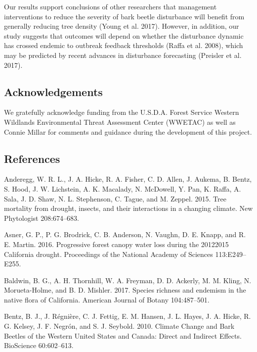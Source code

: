 \documentclass[]{article}
\begin{document}
Our results support conclusions of other researchers that management
interventions to reduce the severity of bark beetle disturbance will
benefit from generally reducing tree density (Young et al. 2017).
However, in addition, our study suggests that outcomes will depend on
whether the disturbance dynamic has crossed endemic to outbreak feedback
thresholds (Raffa et al. 2008), which may be predicted by recent
advances in disturbance forecasting (Preisler et al. 2017).

\subsection{Acknowledgements}\label{acknowledgements}

We gratefully acknowledge funding from the U.S.D.A. Forest Service
Western Wildlands Environmental Threat Assessment Center (WWETAC) as
well as Connie Millar for comments and guidance during the development
of this project.

\subsection*{References}\label{references}

\hypertarget{refs}{}
\hypertarget{ref-anderegg2015a}{}
Anderegg, W. R. L., J. A. Hicke, R. A. Fisher, C. D. Allen, J. Aukema,
B. Bentz, S. Hood, J. W. Lichstein, A. K. Macalady, N. McDowell, Y. Pan,
K. Raffa, A. Sala, J. D. Shaw, N. L. Stephenson, C. Tague, and M.
Zeppel. 2015. Tree mortality from drought, insects, and their
interactions in a changing climate. New Phytologist 208:674--683.

\hypertarget{ref-asner2016}{}
Asner, G. P., P. G. Brodrick, C. B. Anderson, N. Vaughn, D. E. Knapp,
and R. E. Martin. 2016. Progressive forest canopy water loss during the
20122015 California drought. Proceedings of the National Academy of
Sciences 113:E249--E255.

\hypertarget{ref-baldwin2017a}{}
Baldwin, B. G., A. H. Thornhill, W. A. Freyman, D. D. Ackerly, M. M.
Kling, N. Morueta-Holme, and B. D. Mishler. 2017. Species richness and
endemism in the native flora of California. American Journal of Botany
104:487--501.

\hypertarget{ref-bentz2010}{}
Bentz, B. J., J. Régnière, C. J. Fettig, E. M. Hansen, J. L. Hayes, J.
A. Hicke, R. G. Kelsey, J. F. Negrón, and S. J. Seybold. 2010. Climate
Change and Bark Beetles of the Western United States and Canada: Direct
and Indirect Effects. BioScience 60:602--613.
\end{document}
